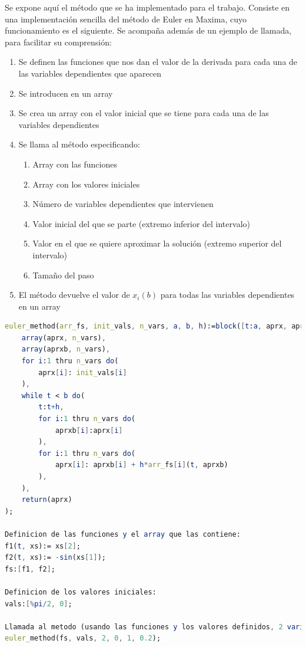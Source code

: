 \documentclass[12pt]{article}       %
\begin{document}
Se expone aquí el método que se ha implementado para el trabajo. Consiste en una implementación sencilla del método de Euler en Maxima, cuyo funcionamiento es el siguiente. Se acompaña además de un ejemplo de llamada, para facilitar su comprensión:
\begin{enumerate}
    \item Se definen las funciones que nos dan el valor de la derivada para cada una de las variables dependientes que aparecen
    \item Se introducen en un array
    \item Se crea un array con el valor inicial que se tiene para cada una de las variables dependientes
    \item Se llama al método especificando:
    \begin{enumerate}
        \item Array con las funciones
        \item Array con los valores iniciales
        \item Número de variables dependientes que intervienen
        \item Valor inicial del que se parte (extremo inferior del intervalo)
        \item Valor en el que se quiere aproximar la solución (extremo superior del intervalo)
        \item Tamaño del paso
    \end{enumerate}
    \item El método devuelve el valor de $x_i(b)$ para todas las variables dependientes en un array
\end{enumerate}

\begin{lstlisting}[language=Mathematica]
euler_method(arr_fs, init_vals, n_vars, a, b, h):=block([t:a, aprx, aprxb],
    array(aprx, n_vars),
    array(aprxb, n_vars),
    for i:1 thru n_vars do(
        aprx[i]: init_vals[i]
    ),
    while t < b do(
        t:t+h, 
        for i:1 thru n_vars do(
            aprxb[i]:aprx[i]
        ),
        for i:1 thru n_vars do(
            aprx[i]: aprxb[i] + h*arr_fs[i](t, aprxb)
        ),
    ),
    return(aprx)
);

Definicion de las funciones y el array que las contiene:
f1(t, xs):= xs[2];
f2(t, xs):= -sin(xs[1]);
fs:[f1, f2];

Definicion de los valores iniciales:
vals:[%pi/2, 0];

Llamada al metodo (usando las funciones y los valores definidos, 2 variables dependientes, extremo inferior 0, extremo superior 1, h=0.2):
euler_method(fs, vals, 2, 0, 1, 0.2);

\end{lstlisting}
\end{document}
